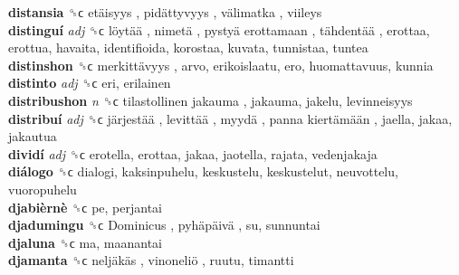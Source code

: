 \textbf{distansia} ␝ϲ   etäisyys ,  pidättyvyys ,  välimatka , viileys  \\
\textbf{distinguí} \emph{adj}  ␝ϲ   löytää ,  nimetä ,  pystyä erottamaan ,  tähdentää , erottaa, erottua, havaita, identifioida, korostaa, kuvata, tunnistaa, tuntea  \\
\textbf{distinshon} ␝ϲ   merkittävyys , arvo, erikoislaatu, ero, huomattavuus, kunnia  \\
\textbf{distinto} \emph{adj}  ␝ϲ  eri, erilainen  \\
\textbf{distribushon} \emph{n}  ␝ϲ   tilastollinen jakauma , jakauma, jakelu, levinneisyys  \\
\textbf{distribuí} \emph{adj}  ␝ϲ   järjestää ,  levittää ,  myydä ,  panna kiertämään , jaella, jakaa, jakautua  \\
\textbf{dividí} \emph{adj}  ␝ϲ  erotella, erottaa, jakaa, jaotella, rajata, vedenjakaja  \\
\textbf{diálogo} ␝ϲ  dialogi, kaksinpuhelu, keskustelu, keskustelut, neuvottelu, vuoropuhelu  \\
\textbf{djabièrnè} ␝ϲ  pe, perjantai  \\
\textbf{djadumingu} ␝ϲ   Dominicus ,  pyhäpäivä , su, sunnuntai  \\
\textbf{djaluna} ␝ϲ  ma, maanantai  \\
\textbf{djamanta} ␝ϲ   neljäkäs ,  vinoneliö , ruutu, timantti  \\
